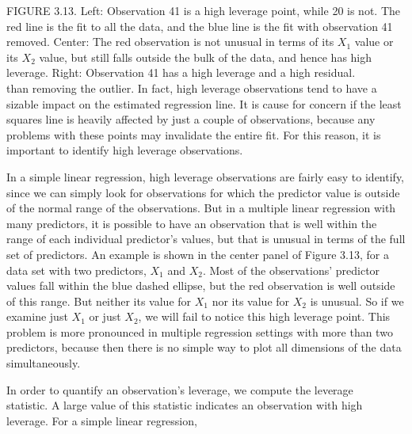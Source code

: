 \documentclass[10pt]{article}
\begin{document}
FIGURE 3.13. Left: Observation 41 is a high leverage point, while 20 is not. The red line is the fit to all the data, and the blue line is the fit with observation 41 removed. Center: The red observation is not unusual in terms of its $X_{1}$ value or its $X_{2}$ value, but still falls outside the bulk of the data, and hence has high leverage. Right: Observation 41 has a high leverage and a high residual.\\
than removing the outlier. In fact, high leverage observations tend to have a sizable impact on the estimated regression line. It is cause for concern if the least squares line is heavily affected by just a couple of observations, because any problems with these points may invalidate the entire fit. For this reason, it is important to identify high leverage observations.

In a simple linear regression, high leverage observations are fairly easy to identify, since we can simply look for observations for which the predictor value is outside of the normal range of the observations. But in a multiple linear regression with many predictors, it is possible to have an observation that is well within the range of each individual predictor's values, but that is unusual in terms of the full set of predictors. An example is shown in the center panel of Figure 3.13, for a data set with two predictors, $X_{1}$ and $X_{2}$. Most of the observations' predictor values fall within the blue dashed ellipse, but the red observation is well outside of this range. But neither its value for $X_{1}$ nor its value for $X_{2}$ is unusual. So if we examine just $X_{1}$ or just $X_{2}$, we will fail to notice this high leverage point. This problem is more pronounced in multiple regression settings with more than two predictors, because then there is no simple way to plot all dimensions of the data simultaneously.

In order to quantify an observation's leverage, we compute the leverage\\
statistic. A large value of this statistic indicates an observation with high leverage. For a simple linear regression,
\end{document}
